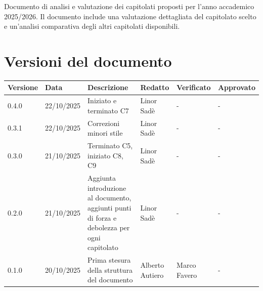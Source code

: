 \documentclass[a4paper,11pt]{article}
\newcommand{\CurrentVersion}{0.4.0} %
\begin{document}
\vspace{0.5cm}

\begin{center}
\begin{tcolorbox}[width=0.9\textwidth,arc=3mm,boxrule=0.8pt,title={\bfseries Abstract}]
Documento di analisi e valutazione dei capitolati proposti per l'anno accademico 2025/2026. Il documento include una valutazione dettagliata del capitolato scelto e un'analisi comparativa degli altri capitolati disponibili.
\end{tcolorbox}
\end{center}

\newpage
\section{Versioni del documento}

{\footnotesize %
\begin{tabularx}{\textwidth}{|p{1.5cm}|p{2cm}|X|p{2cm}|p{2cm}|p{2cm}|}
\hline
\rowcolor{gray!40} %
\textbf{Versione} & \textbf{Data} & \textbf{Descrizione} & \textbf{Redatto} & \textbf{Verificato} & \textbf{Approvato} \\
\hline
\CurrentVersion & 22/10/2025 & Iniziato e terminato C7& Linor Sadè & - & - \\
\hline
\hline
0.3.1 & 22/10/2025 & Correzioni minori stile & Linor Sadè & - & - \\
\hline
0.3.0 & 21/10/2025 & Terminato C5, iniziato C8, C9 & Linor Sadè & - & - \\
\hline
0.2.0 & 21/10/2025 & Aggiunta introduzione al documento, aggiunti punti di forza e debolezza per ogni capitolato & Linor Sadè & - & - \\
\hline
0.1.0 & 20/10/2025 & Prima stesura della struttura del documento & Alberto Autiero & Marco Favero & - \\
\hline
\end{tabularx}
}

\newpage

\end{document}
